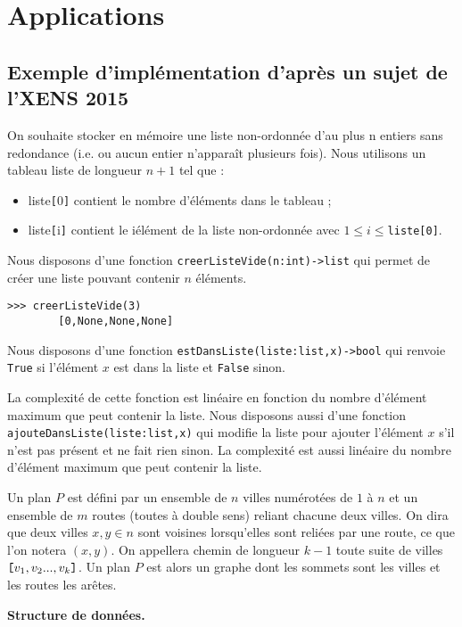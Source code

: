 
\section{Applications}

\subsection{Exemple d'implémentation d'après un sujet de l'XENS 2015}
On souhaite stocker en mémoire une liste non-ordonnée d'au plus n entiers sans redondance (i.e. ou aucun entier n'apparaît
plusieurs fois). Nous utilisons un tableau 
liste de longueur $n+1$ tel que :
\begin{itemize}
\item liste\verb![!0\verb!]! contient le nombre d'éléments dans le tableau ;
\item liste\verb![!i\verb!]! contient le i\ieme élément de la liste non-ordonnée avec $1\leqslant i \leqslant $\texttt{liste[0]}.
\end{itemize}
Nous disposons d'une fonction \texttt{creerListeVide(n:int)->list} qui permet de créer une liste pouvant contenir $n$ éléments.

\begin{lstlisting}
>>> creerListeVide(3)
        [0,None,None,None]
\end{lstlisting}

Nous disposons d'une fonction \lstinline{estDansListe(liste:list,x)->bool} qui renvoie \lstinline{True} si l'élément $x$ est dans la liste et \lstinline{False} sinon.

La complexité de cette fonction est linéaire en fonction du nombre d'élément maximum que peut contenir la liste. 
Nous disposons aussi d'une fonction \lstinline{ajouteDansListe(liste:list,x)} qui modifie la liste pour ajouter l'élément $x$ s'il n'est pas présent et ne fait rien sinon. La complexité est aussi linéaire du nombre d'élément maximum que peut contenir la liste.

Un plan $P$ est défini par un ensemble de $n$ villes numérotées de $1$ à $n$ et un ensemble de $m$ routes (toutes à double sens)
reliant chacune deux villes. On dira que deux villes $x, y \in  n$ sont voisines lorsqu'elles sont reliées par une route, ce que l'on notera $(x, y)$. On appellera chemin de longueur $k-1$ toute suite de villes $\verb![!v_1, v_2 ... , v_k\verb!]!$. Un plan $P$ est alors un graphe dont les sommets sont les villes et les routes les arêtes.

\textbf{Structure de données. } 

